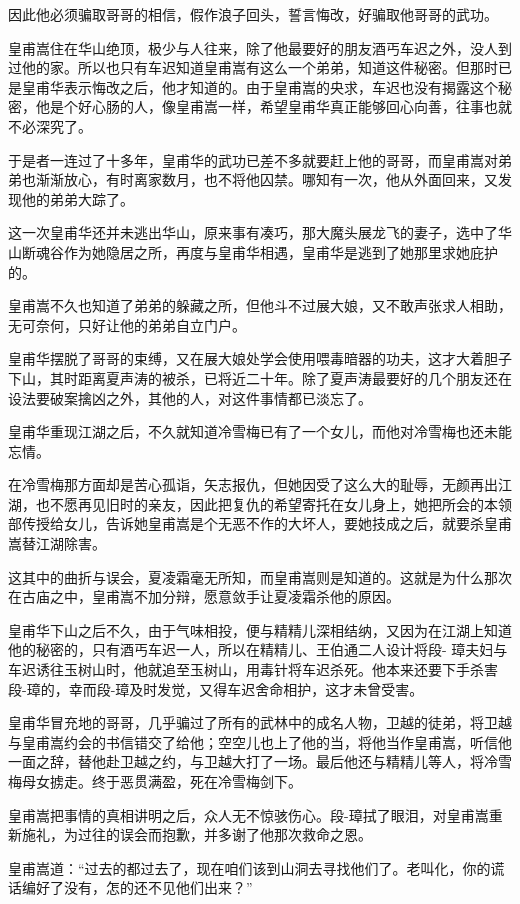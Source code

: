 \documentclass[12pt,oneside]{book}
\begin{document}
因此他必须骗取哥哥的相信，假作浪子回头，誓言悔改，好骗取他哥哥的武功。

皇甫嵩住在华山绝顶，极少与人往来，除了他最要好的朋友酒丐车迟之外，没人到过他的家。所以也只有车迟知道皇甫嵩有这么一个弟弟，知道这件秘密。但那时已是皇甫华表示悔改之后，他才知道的。由于皇甫嵩的央求，车迟也没有揭露这个秘密，他是个好心肠的人，像皇甫嵩一样，希望皇甫华真正能够回心向善，往事也就不必深究了。

于是者一连过了十多年，皇甫华的武功已差不多就要赶上他的哥哥，而皇甫嵩对弟弟也渐渐放心，有时离家数月，也不将他囚禁。哪知有一次，他从外面回来，又发现他的弟弟大踪了。

这一次皇甫华还并未逃出华山，原来事有凑巧，那大魔头展龙飞的妻子，选中了华山断魂谷作为她隐居之所，再度与皇甫华相遇，皇甫华是逃到了她那里求她庇护的。

皇甫嵩不久也知道了弟弟的躲藏之所，但他斗不过展大娘，又不敢声张求人相助，无可奈何，只好让他的弟弟自立门户。

皇甫华摆脱了哥哥的束缚，又在展大娘处学会使用喂毒暗器的功夫，这才大着胆子下山，其时距离夏声涛的被杀，已将近二十年。除了夏声涛最要好的几个朋友还在设法要破案擒凶之外，其他的人，对这件事情都已淡忘了。

皇甫华重现江湖之后，不久就知道冷雪梅已有了一个女儿，而他对冷雪梅也还未能忘情。

在冷雪梅那方面却是苦心孤诣，矢志报仇，但她因受了这么大的耻辱，无颜再出江湖，也不愿再见旧时的亲友，因此把复仇的希望寄托在女儿身上，她把所会的本领部传授给女儿，告诉她皇甫嵩是个无恶不作的大坏人，要她技成之后，就要杀皇甫嵩替江湖除害。

这其中的曲折与误会，夏凌霜毫无所知，而皇甫嵩则是知道的。这就是为什么那次在古庙之中，皇甫嵩不加分辩，愿意敛手让夏凌霜杀他的原因。

皇甫华下山之后不久，由于气味相投，便与精精儿深相结纳，又因为在江湖上知道他的秘密的，只有酒丐车迟一人，所以在精精儿、王伯通二人设计将段-
璋夫妇与车迟诱往玉树山时，他就追至玉树山，用毒针将车迟杀死。他本来还要下手杀害段-璋的，幸而段-璋及时发觉，又得车迟舍命相护，这才未曾受害。

皇甫华冒充地的哥哥，几乎骗过了所有的武林中的成名人物，卫越的徒弟，将卫越与皇甫嵩约会的书信错交了给他；空空儿也上了他的当，将他当作皇甫嵩，听信他一面之辞，替他赴卫越之约，与卫越大打了一场。最后他还与精精儿等人，将冷雪梅母女掳走。终于恶贯满盈，死在冷雪梅剑下。

皇甫嵩把事情的真相讲明之后，众人无不惊骇伤心。段-璋拭了眼泪，对皇甫嵩重新施礼，为过往的误会而抱歉，并多谢了他那次救命之恩。

皇甫嵩道：``过去的都过去了，现在咱们该到山洞去寻找他们了。老叫化，你的谎话编好了没有，怎的还不见他们出来？''
\end{document}
